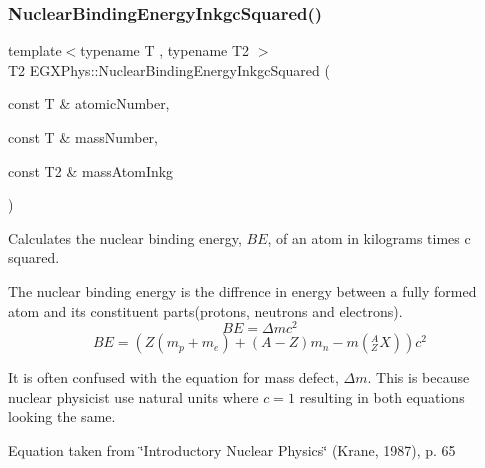 \subsubsection{\texorpdfstring{Nuclear\+Binding\+Energy\+Inkgc\+Squared()}{NuclearBindingEnergyInkgcSquared()}}
{\footnotesize\ttfamily template$<$typename T , typename T2 $>$ \\
T2 E\+G\+X\+Phys\+::\+Nuclear\+Binding\+Energy\+Inkgc\+Squared (\begin{DoxyParamCaption}\item[{const T \&}]{atomic\+Number,  }\item[{const T \&}]{mass\+Number,  }\item[{const T2 \&}]{mass\+Atom\+Inkg }\end{DoxyParamCaption})}



Calculates the nuclear binding energy, $BE$, of an atom in kilograms times c squared. 

The nuclear binding energy is the diffrence in energy between a fully formed atom and its constituent parts(protons, neutrons and electrons). \[BE = \Delta m c^2\] \[BE = \left (Z(m_p + m_e)+(A-Z)m_n - m({^A_ZX}) \right ) c^2\]

It is often confused with the equation for mass defect, $\Delta m$. This is because nuclear physicist use natural units where $c = 1$ resulting in both equations looking the same.

Equation taken from \char`\"{}\+Introductory Nuclear Physics\char`\"{} (Krane, 1987), p. 65


